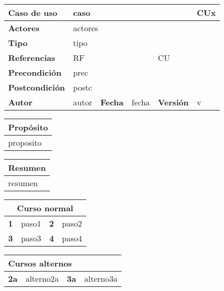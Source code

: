 \usepackage[table]{xcolor}

\begin{table}[H]
\centering
\begin{tabular}{|m{3cm}|m{4cm}|m{2cm}|m{2cm}|m{2cm}|m{1cm}|}
\hline
\textbf{Caso de uso} &  \multicolumn{4}{m{11cm}|}{caso} \vline &  \cellcolor{gray!40}CUx \\
\hline
\textbf{Actores} & \multicolumn{5}{m{11cm}|}{actores} \\
\hline
\textbf{Tipo} & \multicolumn{5}{m{11cm}|}{tipo} \\
\hline
\textbf{Referencias} &\multicolumn{3}{m{11cm}|}{RF} & \multicolumn{2}{m{4cm}|}{CU} \\
\hline
\textbf{Precondición} & \multicolumn{5}{m{11cm}|}{prec} \\
\hline
\textbf{Postcondición} & \multicolumn{5}{m{11cm}|}{postc} \\
\hline
\textbf{Autor} & autor & \textbf{Fecha} & fecha & \textbf{Versión} & v \\
\hline
\end{tabular}

\vspace{1cm}

\begin{tabular}{|m{16.2cm}|}
\hline
\textbf{Propósito} \\
\hline
proposito \\
\hline
\end{tabular}

\vspace{1cm}

\begin{tabular}{|m{16.2cm}|}
\hline
\textbf{Resumen} \\
\hline
resumen \\
\hline
\end{tabular}

\vspace{1cm}

\begin{tabular}{|m{4pt}|m{7.33cm}|m{4pt}|m{7.33cm}|}
\hline
\multicolumn{4}{|c|}{\textbf{Curso normal}} \\
\hline
\textbf{1} & paso1 & \textbf{2} & paso2 \\
\hline
\textbf{3} & paso3 & \textbf{4} & paso4 \\
\hline
\end{tabular}

\vspace{1cm}

\begin{tabular}{|m{10pt}|m{7.15cm}|m{10pt}|m{7.15cm}|}
\hline
\multicolumn{4}{|m{16.2cm}|}{\textbf{Cursos alternos}} \\
\hline
\textbf{2a} & alterno2a & \textbf{3a} & alterno3a  \\
\hline
\end{tabular}


\end{table}

